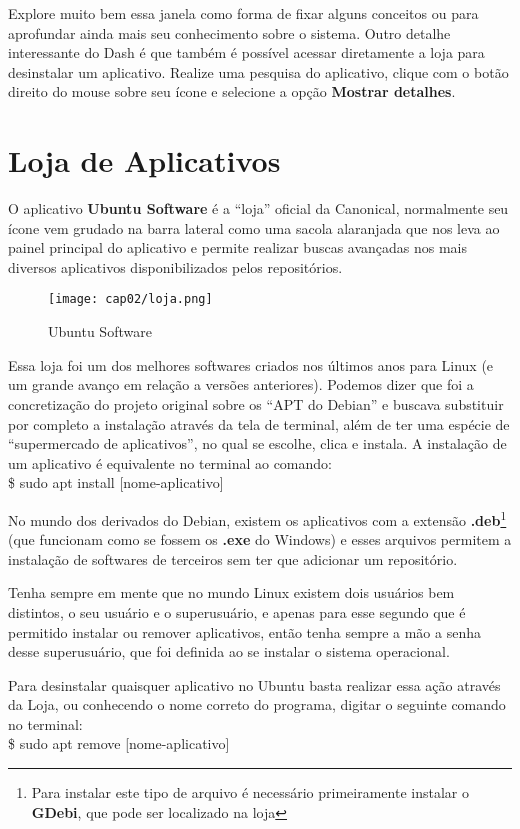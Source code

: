 Explore muito bem essa janela como forma de fixar alguns conceitos ou para aprofundar ainda mais seu conhecimento sobre o sistema. Outro detalhe interessante do Dash é que também é possível acessar diretamente a loja para desinstalar um aplicativo. Realize uma pesquisa do aplicativo, clique com o botão direito do mouse sobre seu ícone e selecione a opção \textbf{Mostrar detalhes}.

\section{Loja de Aplicativos}
O aplicativo \textbf{Ubuntu Software} é a ``loja'' oficial da Canonical, normalmente seu ícone vem grudado na barra lateral como uma sacola alaranjada que nos leva ao painel principal do aplicativo e permite realizar buscas avançadas nos mais diversos aplicativos disponibilizados pelos repositórios.
\begin{figure}[H]
 \centering\texttt{[image: cap02/loja.png]}
 \caption{Ubuntu Software}
\end{figure}

Essa loja foi um dos melhores softwares criados nos últimos anos para Linux (e um grande avanço em relação a versões anteriores). Podemos dizer que foi a concretização do projeto original sobre os ``APT do Debian'' e buscava substituir por completo a instalação através da tela de terminal, além de ter uma espécie de ``supermercado de aplicativos'', no qual se escolhe, clica e instala. A instalação de um aplicativo é equivalente no terminal ao comando: \\
{\ttfamily\$ sudo apt install [nome-aplicativo]} 

No mundo dos derivados do Debian, existem os aplicativos com a extensão \textbf{.deb}\footnote{Para instalar este tipo de arquivo é necessário primeiramente instalar o \textbf{GDebi}, que pode ser localizado na loja} (que funcionam como se fossem os \textbf{.exe} do Windows) e esses arquivos permitem a instalação de softwares de terceiros sem ter que adicionar um repositório.
\\[3mm]
\begin{dica}[Sudo] Tenha sempre em mente que no mundo Linux existem dois usuários bem distintos, o seu usuário e o superusuário, e apenas para esse segundo que é permitido instalar ou remover aplicativos, então tenha sempre a mão a senha desse superusuário, que foi definida ao se instalar o sistema operacional.
\end{dica}
Para desinstalar quaisquer aplicativo no Ubuntu basta realizar essa ação através da Loja, ou conhecendo o nome correto do programa, digitar o seguinte comando no terminal: \\
{\ttfamily\$ sudo apt remove [nome-aplicativo]}

